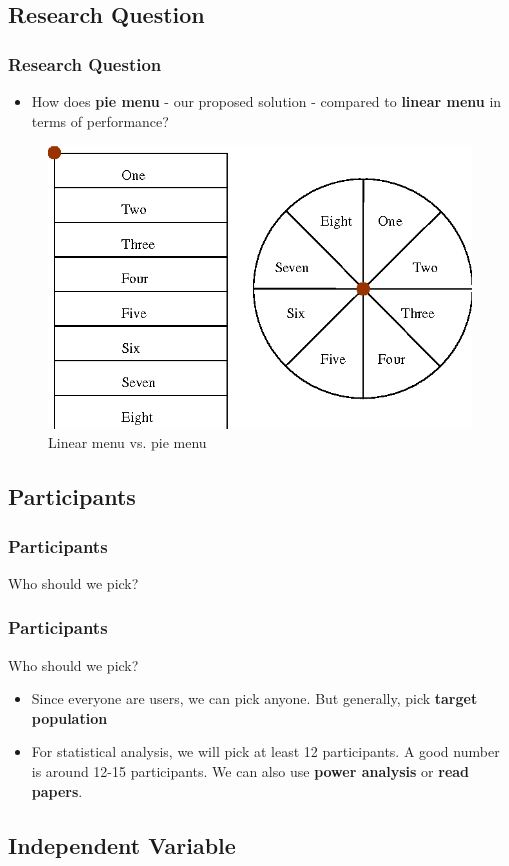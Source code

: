 \documentclass{beamer}
\begin{document}
\subsection{Research Question}

\begin{frame}
	\frametitle{Research Question}
	\begin{itemize}
		\item  How does \textbf{pie menu} - our proposed solution - compared to \textbf{linear menu} in terms of performance?
	\end{itemize}
	\begin{figure}
		\includegraphics[width=0.6\linewidth]{pie}
		\caption{Linear menu vs. pie menu}
	\end{figure}
\end{frame}

\subsection{Participants}

\begin{frame}
	\frametitle{Participants}
	Who should we pick?
\end{frame}

\begin{frame}
	\frametitle{Participants}
	Who should we pick?
	\begin{itemize}
		\item  Since everyone are users, we can pick anyone.  But generally, pick \textbf{target population}
		\item For statistical analysis, we will pick at least 12 participants.  A good number is around 12-15 participants.   We can also use \textbf{power analysis} or \textbf{read papers}.
	\end{itemize}
\end{frame}

\subsection{Independent Variable}
\end{document}
